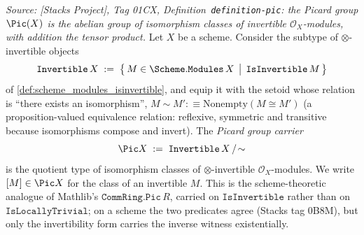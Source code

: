 \begin{definition}\leanok
  \label{def:pic_carrier}
  \textit{Source: [Stacks Project], Tag 01CX, Definition~\texttt{definition-pic}:
  the Picard group \(\Pic(X)\) is the abelian group of isomorphism classes of
  invertible \(\mathcal{O}_X\)-modules, with addition the tensor product.}
  Let \(X\) be a scheme. Consider the subtype of \(\otimes\)-invertible objects
  \[
    \mathtt{Invertible}\,X
    \;:=\;
    \bigl\{\, M \in \Scheme.\mathtt{Modules}\,X
              \,\bigm|\, \mathtt{IsInvertible}\,M \,\bigr\}
  \]
  of \cref{def:scheme_modules_isinvertible}, and equip it with the setoid whose
  relation is ``there exists an isomorphism'',
  \(M \sim M' :\equiv \mathrm{Nonempty}(M \cong M')\) (a proposition-valued
  equivalence relation: reflexive, symmetric and transitive because isomorphisms
  compose and invert). The \emph{Picard group carrier}
  \[
    \Pic X \;:=\; \mathtt{Invertible}\,X \,/\!\sim
  \]
  is the quotient type of isomorphism classes of \(\otimes\)-invertible
  \(\mathcal{O}_X\)-modules. We write \([M] \in \Pic X\) for the class of an
  invertible \(M\). This is the scheme-theoretic analogue of Mathlib's
  \(\mathtt{CommRing.Pic}\,R\), carried on \(\mathtt{IsInvertible}\) rather than on
  \(\mathtt{IsLocallyTrivial}\); on a scheme the two predicates agree (Stacks tag
  0B8M), but only the invertibility form carries the inverse witness existentially.
\end{definition}

